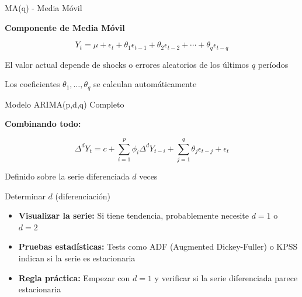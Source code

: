 \documentclass{beamer}
\begin{document}
\begin{frame}{MA(q) - Media Móvil}
    \begin{center}
        \Large{\textbf{Componente de Media Móvil}}
        
        \[
        Y_t = \mu + \epsilon_t + \theta_1 \epsilon_{t-1} + \theta_2 \epsilon_{t-2} + \cdots + \theta_q \epsilon_{t-q}
        \]
        
        El valor actual depende de shocks o errores aleatorios de los últimos $q$ períodos
        
        \vspace{0.3cm}
        
        Los coeficientes $\theta_1, \ldots, \theta_q$ se calculan automáticamente
    \end{center}
\end{frame}

\begin{frame}{Modelo ARIMA(p,d,q) Completo}
    \begin{center}
        \Large{\textbf{Combinando todo:}}
        
        \[
        \Delta^d Y_t = c + \sum_{i=1}^{p} \phi_i \Delta^d Y_{t-i} + \sum_{j=1}^{q} \theta_j \epsilon_{t-j} + \epsilon_t
        \]
        
        \vspace{0.8cm}
        
        Definido sobre la serie diferenciada $d$ veces
    \end{center}
\end{frame}

\begin{frame}{Determinar $d$ (diferenciación)}
    \begin{itemize}
        \item \textbf{Visualizar la serie:} Si tiene tendencia, probablemente necesite $d=1$ o $d=2$
        \item \textbf{Pruebas estadísticas:} Tests como ADF (Augmented Dickey-Fuller) o KPSS indican si la serie es estacionaria
        \item \textbf{Regla práctica:} Empezar con $d=1$ y verificar si la serie diferenciada parece estacionaria
    \end{itemize}
\end{frame}
\end{document}
